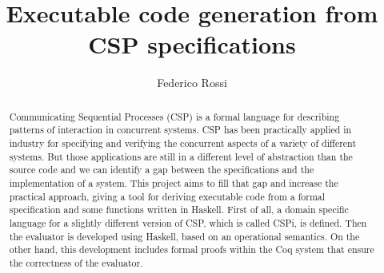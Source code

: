 \documentclass{comjnl}
\begin{document}
\title[Executable code generation from CSP specifications]{Executable code generation from CSP specifications}
\author{Federico Rossi}
 




\begin{abstract}
Communicating Sequential Processes (CSP) is a formal language for describing
patterns of interaction in concurrent systems. CSP has been practically applied
in industry for specifying and verifying the concurrent aspects of a
variety of different systems. But those applications are still in a different level of
abstraction than the source code and we can identify a gap between the
specifications and the implementation of a system. This project aims to fill that gap
and increase the practical approach, giving a tool for deriving executable code from a
formal specification and some functions written in Haskell. First of all, a domain 
specific language for a slightly different version of CSP, which is called CSPi, is
defined. Then the evaluator is developed using Haskell, based on an operational semantics.
On the other hand, this development includes formal proofs within the Coq system that 
ensure the correctness of the evaluator.
\end{abstract}

\maketitle
\end{document}
